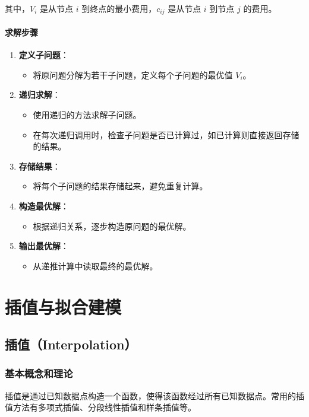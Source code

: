 \documentclass[UTF8]{ctexart}
\begin{document}
其中，\( V_i \) 是从节点 \( i \) 到终点的最小费用，\( c_{ij} \) 是从节点 \( i \) 到节点 \( j \) 的费用。

\paragraph{求解步骤}
\begin{enumerate}
    \item \textbf{定义子问题}：
        \begin{itemize}
            \item 将原问题分解为若干子问题，定义每个子问题的最优值 \( V_i \)。
        \end{itemize}
    \item \textbf{递归求解}：
        \begin{itemize}
            \item 使用递归的方法求解子问题。
            \item 在每次递归调用时，检查子问题是否已计算过，如已计算则直接返回存储的结果。
        \end{itemize}
    \item \textbf{存储结果}：
        \begin{itemize}
            \item 将每个子问题的结果存储起来，避免重复计算。
        \end{itemize}
    \item \textbf{构造最优解}：
        \begin{itemize}
            \item 根据递归关系，逐步构造原问题的最优解。
        \end{itemize}
    \item \textbf{输出最优解}：
        \begin{itemize}
            \item 从递推计算中读取最终的最优解。
        \end{itemize}
\end{enumerate}

\newpage

\section {插值与拟合建模}
\subsection {插值（Interpolation）}
\subsubsection {基本概念和理论}
插值是通过已知数据点构造一个函数，使得该函数经过所有已知数据点。常用的插值方法有多项式插值、分段线性插值和样条插值等。
\end{document}
